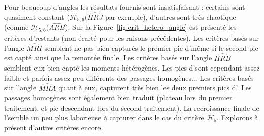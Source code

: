 \documentclass[main.tex]{subfiles}
\begin{document}
Pour beaucoup d'angles les résultats fournis sont insatisfaisant : certains sont quasiment constant ($\mathcal{H}_{5,6}(\widehat{HRJ}$ par exemple), d'autres sont très chaotique (comme $\mathcal{H}_{5,6}(\widehat{ARB}$). Sur la Figure~\ref{fig:crit_hetero_angle} est présenté les critères d'\hetero restants (\ie non écarté pour les raisons précédentes). 
Les critères basés sur l'angle $\widehat{MRI}$ semblent ne pas bien capturés le premier pic d'\hetero même si le second pic est capté ainsi que la remontée finale. Les critères basés sur l'angle $\widehat{HRB}$ semblent eux bien capté les moments hétérogènes. Les pics d'\hetero sont cependant assez faible et parfois assez peu différents des passages homogènes... Les critères basés sur l'angle $\widehat{MRA}$ quant à eux, capturent très bien les deux premiers pics d'\hetero. Les passages homogènes sont également bien traduit (plateau lors du premier traitement, et pic descendant lors du second traitement). La recroissance finale de l'\hetero semble un peu plus laborieuse à capturer dans le cas du critère $\mathcal{H}_5$.
Explorons à présent d'autres critères encore.
\end{document}

